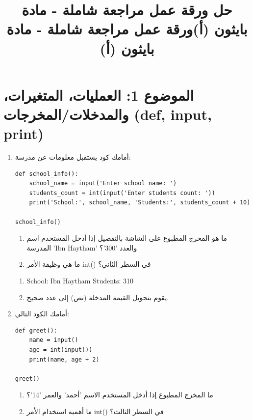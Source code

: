\documentclass[14pt]{extarticle}
\title{حل ورقة عمل مراجعة شاملة - مادة بايثون (أ)}
\title{ورقة عمل مراجعة شاملة - مادة بايثون (أ)}
\begin{document}
\maketitle
\thispagestyle{fancy}

\section*{الموضوع 1: العمليات، المتغيرات، والمدخلات/المخرجات (\textenglish{def, input, print})}
\begin{enumerate}[itemsep=3em]

\item
أمامك كود يستقبل معلومات عن مدرسة:
\begin{boxCode}
\begin{english}
\begin{verbatim}
def school_info():
    school_name = input('Enter school name: ')
    students_count = int(input('Enter students count: '))
    print('School:', school_name, 'Students:', students_count + 10)

school_info()
\end{verbatim}
\end{english}
\end{boxCode}
\begin{enumerate}
    \item ما هو المخرج المطبوع على الشاشة بالتفصيل إذا أدخل المستخدم اسم المدرسة '\textenglish{Ibn Haytham}' والعدد '\textenglish{300}'؟
    \item ما هي وظيفة الأمر \textenglish{int()} في السطر الثاني؟
\end{enumerate}

\ifwithsols
\begin{boxSolution}
\begin{enumerate}
    \item \textenglish{School: Ibn Haytham Students: 310}
    \item يقوم بتحويل القيمة المدخلة (نص) إلى عدد صحيح.
\end{enumerate}
\end{boxSolution}
\fi

\item
أمامك الكود التالي:
\begin{boxCode}
\begin{english}
\begin{verbatim}
def greet():
    name = input()
    age = int(input())
    print(name, age + 2)

greet()
\end{verbatim}
\end{english}
\end{boxCode}
\begin{enumerate}
    \item ما المخرج المطبوع إذا أدخل المستخدم الاسم 'أحمد' والعمر '\textenglish{14}'؟
    \item ما أهمية استخدام الأمر \textenglish{int()} في السطر الثالث؟
\end{enumerate}


\end{enumerate}
\end{document}
